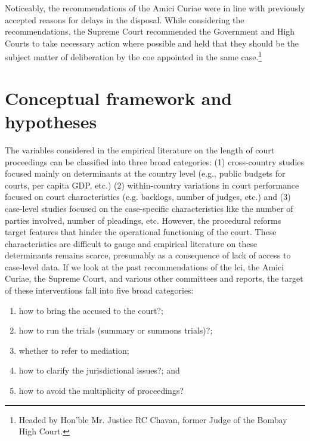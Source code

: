 \documentclass[12pt,a4paper]{article}
\begin{document}
	Noticeably, the recommendations of the Amici Curiae were in line with previously accepted reasons for delays in the disposal. While considering the recommendations, the Supreme Court recommended the Government and High Courts to take necessary action where possible and held that they should be the subject matter of deliberation by the \gls{coe} appointed in the same case.\footnote{Headed by Hon’ble Mr. Justice RC Chavan, former Judge of the Bombay High Court.}
	
	\section{Conceptual framework and hypotheses}
	\label{sec:select-case-char}
	
	The variables considered in the empirical literature on the length of court proceedings can be classified into three broad categories: (1) cross-country studies focused mainly on determinants at the country level (e.g., public budgets for courts, per capita GDP, etc.) (2) within-country variations in court performance focused on court characteristics (e.g. backlogs, number of judges, etc.) and (3) case-level studies focused on the case-specific characteristics like the number of parties involved, number of pleadings, etc. However, the procedural reforms target features that hinder the operational functioning of the court. These characteristics are difficult to gauge and empirical literature on these determinants remains scarce, presumably as a consequence of lack of access to case-level data. If we look at the past recommendations of the \gls{lci}, the Amici Curiae, the Supreme Court, and various other committees and reports, the target of these interventions fall into five broad categories:
	
	
	\begin{enumerate}
		\item how to bring the accused to the court?;
		\item how to run the trials (summary or summons trials)?;
		\item whether to refer to mediation;
		\item how to clarify the jurisdictional issues?; and
		\item how to avoid the multiplicity of proceedings?
	\end{enumerate}
	
\end{document}
